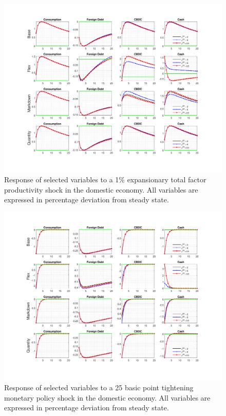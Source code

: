 \documentclass[12pt, a4paper]{article}
\begin{document}
\begin{figure}[H]
    \hspace{-0.1cm}
	\centering
	\centerline{\includegraphics[trim = 0mm 23mm 0mm 18mm, clip, scale=0.93]{TFP_liq.pdf}}
	\caption{Response of selected variables to a 1\% expansionary total factor productivity shock in the domestic economy. All variables are expressed in percentage deviation from steady state.}
	\label{TFP_liq}
\end{figure}
\begin{figure}[H]
  \hspace{-0.1cm}
	\centering
	\centerline{\includegraphics[trim = 0mm 23mm 0mm 18mm, clip, scale=0.93]{monetary_liq.pdf}}
	\caption{Response of selected variables to a 25 basic point tightening monetary policy shock in the domestic economy. All variables are expressed in percentage deviation from steady state.}
	\label{monalt_liq}
\end{figure}
\end{document}
